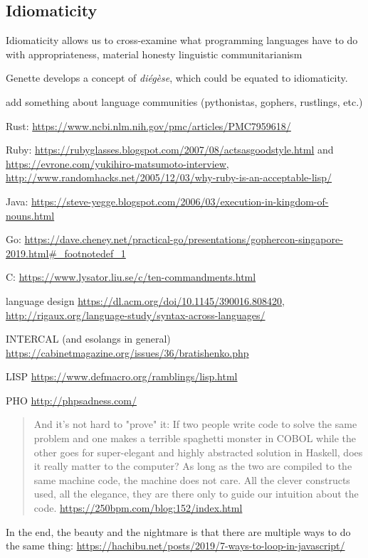\subsection{Idiomaticity}
\label{subsec:idiomaticity}

Idiomaticity allows us to cross-examine what programming languages have to do with appropriateness, material honesty linguistic communitarianism

Genette develops a concept of \emph{diégèse}, which could be equated to idiomaticity.

add something about language communities (pythonistas, gophers, rustlings, etc.)

Rust: \url{https://www.ncbi.nlm.nih.gov/pmc/articles/PMC7959618/}

Ruby: \url{https://rubyglasses.blogspot.com/2007/08/actsasgoodstyle.html} and \url{https://evrone.com/yukihiro-matsumoto-interview}, \url{http://www.randomhacks.net/2005/12/03/why-ruby-is-an-acceptable-lisp/}

Java: \url{https://steve-yegge.blogspot.com/2006/03/execution-in-kingdom-of-nouns.html}

Go: \url{https://dave.cheney.net/practical-go/presentations/gophercon-singapore-2019.html#_footnotedef_1}

C: \url{https://www.lysator.liu.se/c/ten-commandments.html}

language design \url{https://dl.acm.org/doi/10.1145/390016.808420}, \url{http://rigaux.org/language-study/syntax-across-languages/}

INTERCAL (and esolangs in general) \url{https://cabinetmagazine.org/issues/36/bratishenko.php}

LISP \url{https://www.defmacro.org/ramblings/lisp.html}

PHO \url{http://phpsadness.com/}

\begin{quote}
    And it's not hard to "prove" it: If two people write code to solve the same problem and one makes a terrible spaghetti monster in COBOL while the other goes for super-elegant and highly abstracted solution in Haskell, does it really matter to the computer? As long as the two are compiled to the same machine code, the machine does not care. All the clever constructs used, all the elegance, they are there only to guide our intuition about the code. \url{https://250bpm.com/blog:152/index.html}
\end{quote}

In the end, the beauty and the nightmare is that there are multiple ways to do the same thing: \url{https://hachibu.net/posts/2019/7-ways-to-loop-in-javascript/}

